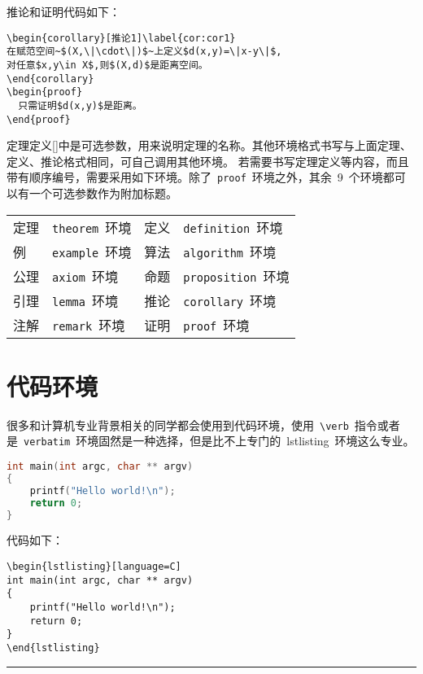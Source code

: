推论和证明代码如下：
\lstset{language=tex,tabsize=4}
\begin{lstlisting}
\begin{corollary}[推论1]\label{cor:cor1}
在赋范空间~$(X,\|\cdot\|)$~上定义$d(x,y)=\|x-y\|$,
对任意$x,y\in X$,则$(X,d)$是距离空间。
\end{corollary}
\begin{proof}
  只需证明$d(x,y)$是距离。
\end{proof}
\end{lstlisting}

定理定义[]中是可选参数，用来说明定理的名称。其他环境格式书写与上面定理、定义、推论格式相同，可自己调用其他环境。
若需要书写定理定义等内容，而且带有顺序编号，需要采用如下环境。除了~\verb|proof|~环境之外，其余~9~个环境都可以有一个可选参数作为附加标题。

\begin{center}
\vspace{0.5em}\noindent\wuhao\begin{tabularx}{0.7\textwidth}{lX|lX}
定理 & \verb|theorem|~环境 & 定义 & \verb|definition|~环境 \\
例 & \verb|example|~环境 & 算法 & \verb|algorithm|~环境 \\
公理 & \verb|axiom|~环境 & 命题 & \verb|proposition|~环境 \\
引理 & \verb|lemma|~环境 & 推论 & \verb|corollary|~环境 \\
注解 & \verb|remark|~环境 & 证明 & \verb|proof|~环境 \\
\end{tabularx}
\end{center}
\section{代码环境}
很多和计算机专业背景相关的同学都会使用到代码环境，使用~\verb|\verb|~指令或者是~\verb|verbatim|~环境固然是一种选择，但是比不上专门的~lstlisting~环境这么专业。
\begin{lstlisting}[language=C]
int main(int argc, char ** argv)
{
	printf("Hello world!\n");
	return 0;
}
\end{lstlisting}


\vspace{1em}

\noindent 代码如下：
\begin{verbatim}
\begin{lstlisting}[language=C]
int main(int argc, char ** argv)
{
    printf("Hello world!\n");
    return 0;
}
\end{lstlisting}
\end{verbatim}
\noindent\hrule\vspace{1em}

